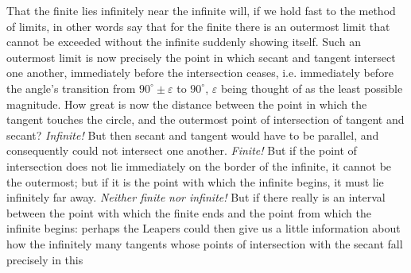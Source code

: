 \documentclass[12pt,a4paper,openany]{book}
\begin{document}
That the finite lies infinitely near the infinite will,
if we hold fast to the method of limits, in other words
say that for the finite there is an outermost limit that
cannot be exceeded without the infinite suddenly showing
itself. Such an outermost limit is now precisely the point
in which secant and tangent intersect one another, immediately before
the intersection ceases, i.e. immediately before the angle's
transition from $90^{\circ} \pm \varepsilon$ to $90^{\circ}$, $\varepsilon$ being thought of as the
least possible magnitude. How great is now the distance between the point in which the tangent touches the circle, and the outermost point of intersection of
tangent and secant? \emph{Infinite!}
But then secant and tangent would have to be parallel, and
consequently could not intersect one another. \emph{Finite!} But if
the point of intersection does not lie immediately on the border
of the infinite, it cannot be the outermost; but
if it is the point with which the infinite begins, it must
lie infinitely far away. \emph{Neither finite}
\emph{nor infinite!} But if there really is an
interval between the point with which the finite
ends and the point from which the infinite begins:
perhaps the Leapers could then give us a little information about how the infinitely many tangents
whose points of intersection with the secant fall precisely in this
\end{document}
